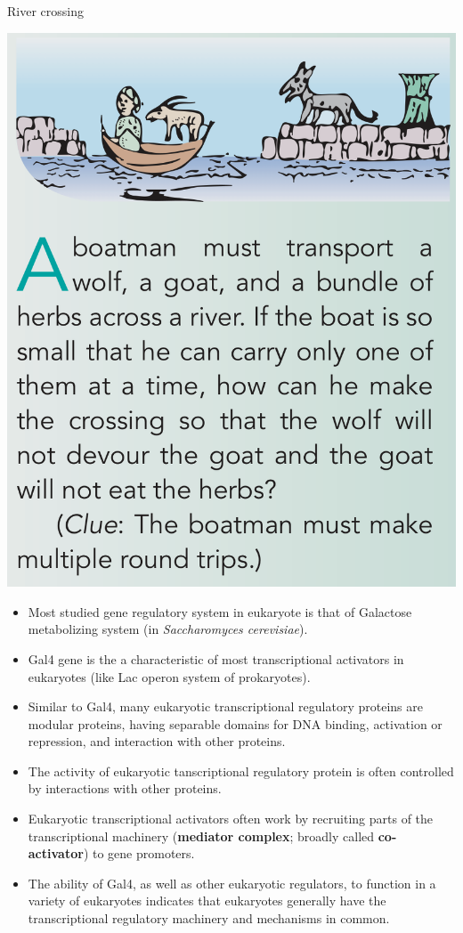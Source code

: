 \documentclass[11pt,dvipsnames,ignorenonframetext,aspectratio=169]{beamer}
\providecommand{\tightlist}{%
  \setlength{\itemsep}{0pt}\setlength{\parskip}{0pt}}
\begin{document}
\begin{frame}{River crossing}
\protect\hypertarget{river-crossing}{}
\begin{center}\includegraphics[width=0.38\linewidth]{../images/river_crossing} \end{center}
\end{frame}

\begin{frame}{}
\protect\hypertarget{section-13}{}
\begin{itemize}
\tightlist
\item
  Most studied gene regulatory system in eukaryote is that of Galactose
  metabolizing system (in \emph{Saccharomyces cerevisiae}).
\item
  Gal4 gene is the a characteristic of most transcriptional activators
  in eukaryotes (like Lac operon system of prokaryotes).
\item
  Similar to Gal4, many eukaryotic transcriptional regulatory proteins
  are modular proteins, having separable domains for DNA binding,
  activation or repression, and interaction with other proteins.
\item
  The activity of eukaryotic tanscriptional regulatory protein is often
  controlled by interactions with other proteins.
\item
  Eukaryotic transcriptional activators often work by recruiting parts
  of the transcriptional machinery (\textbf{mediator complex}; broadly
  called \textbf{co-activator}) to gene promoters.
\item
  The ability of Gal4, as well as other eukaryotic regulators, to
  function in a variety of eukaryotes indicates that eukaryotes
  generally have the transcriptional regulatory machinery and mechanisms
  in common.
\end{itemize}
\end{frame}
\end{document}
